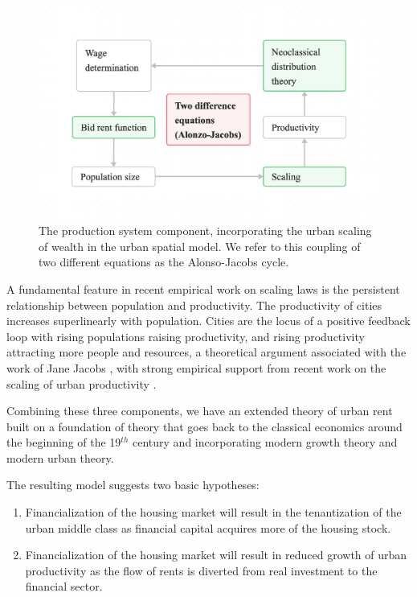 \begin{figure}[!ht]
\centering
\includegraphics[scale=.2]{fig/flow_Alonzo-Jacobs_cycle.png}
\caption[Production system.]{The production system component, incorporating the urban scaling of wealth in the urban spatial model. We refer to this coupling of two different equations as the Alonso-Jacobs cycle.}
\label{fig-alonso-jacobs-cycle}
\end{figure}

A fundamental feature in recent empirical work on scaling laws is the persistent relationship between population and productivity. The productivity of cities increases superlinearly with population. Cities are the locus of a positive feedback loop with rising populations raising productivity, and rising productivity attracting more people and resources, a theoretical argument associated with the work of Jane Jacobs \cite{jacobsEconomyCities1969}, with strong empirical support from recent work on the scaling of urban productivity  \cite{bettencourtGrowthInnovationScaling2007, bettencourtOriginsScalingCities2013, dongUnderstandingMesoscopicScaling2020, loboUrbanScalingProduction2013}.


Combining these three components, we have an extended theory of urban rent built on a foundation of theory that goes back to the \gls{classical economics} around the beginning of the 19$^{th}$ century and incorporating modern growth theory and modern urban theory. 

The resulting model suggests two basic hypotheses:
\begin{enumerate}
    \item Financialization of the housing market will result in the tenantization of the urban middle class as financial capital acquires more of the housing stock. %
    \item Financialization of the housing market will result in reduced growth of urban productivity as the flow of rents is diverted from real investment to the financial sector.
\end{enumerate} 
 
